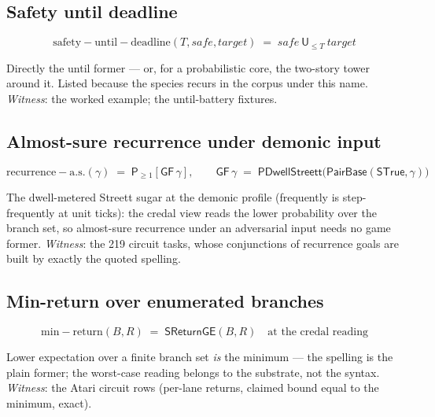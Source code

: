 

\subsection{Safety until deadline}
\label{sec:spec-lang-dsafeuntil}

\[
\mathrm{safety{-}until{-}deadline}(T, \mathit{safe}, \mathit{target})
\;=\; \mathit{safe}\ \mathsf{U}_{\le T}\ \mathit{target}
\]

Directly the until former --- or, for a probabilistic core, the
two-story tower around it. Listed because the species recurs in the
corpus under this name. \emph{Witness}: the worked example; the
until-battery fixtures.



\subsection{Almost-sure recurrence under demonic input}
\label{sec:spec-lang-drecur}

\[
\mathrm{recurrence{-}a.s.}(\gamma) \;=\;
\mathsf{P}_{\ge 1}[\mathsf{GF}\,\gamma],
\qquad
\mathsf{GF}\,\gamma \;=\;
\mathsf{PDwellStreett}\bigl(\mathsf{PairBase}(\mathsf{STrue}, \gamma)\bigr)
\]

The dwell-metered Streett sugar at the demonic profile (frequently
is step-frequently at unit ticks): the credal view reads the
lower probability over the branch set, so almost-sure recurrence
under an adversarial input needs no game former. \emph{Witness}: the
219 circuit tasks, whose conjunctions of recurrence goals are built
by exactly the quoted spelling.



\subsection{Min-return over enumerated branches}
\label{sec:spec-lang-dminret}

\[
\mathrm{min{-}return}(B, R) \;=\;
\mathsf{SReturnGE}(B, R)
\quad\text{at the credal reading}
\]

Lower expectation over a finite branch set \emph{is} the minimum ---
the spelling is the plain former; the worst-case reading belongs to
the substrate, not the syntax. \emph{Witness}: the Atari circuit rows
(per-lane returns, claimed bound equal to the minimum, exact).

